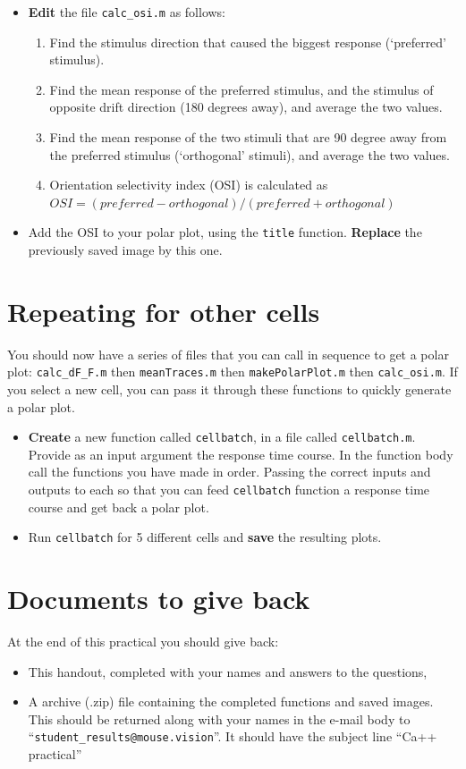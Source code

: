 \documentclass[paper=a4, fontsize=11pt]{article} %
\numberwithin{equation}{section} %
\numberwithin{figure}{section} %
\numberwithin{table}{section} %
\begin{document}
\begin{itemize}
\item \textbf{Edit} the file \texttt{calc\_osi.m} as follows:
  \begin{enumerate}
  \item Find the stimulus direction that caused the biggest response (`preferred' stimulus).
  \item Find the mean response of the preferred stimulus, and the stimulus of opposite drift direction (180 degrees away), and average the two values.
  \item Find the mean response of the two stimuli that are 90 degree away from the preferred stimulus (`orthogonal' stimuli), and average the two values.
  \item Orientation selectivity index (OSI) is calculated as \\ $OSI = {\left(preferred - orthogonal\right)} / {\left(preferred + orthogonal\right)}$
  \end{enumerate}
\item Add the OSI to your polar plot, using the \texttt{title} function.
  \textbf{Replace} the previously saved image by this one.
\end{itemize}


\section{Repeating for other cells}

You should now have a series of files that you can call in sequence to get a polar plot: \texttt{calc\_dF\_F.m} then \texttt{meanTraces.m} then \texttt{makePolarPlot.m} then \texttt{calc\_osi.m}. If you select a new cell, you can pass it through these functions to quickly generate a polar plot.

\begin{itemize}
\item \textbf{Create} a new function called \texttt{cellbatch}, in a file called \texttt{cellbatch.m}. Provide as an input argument the response time course. In the function body call the functions you have made in order. Passing the correct inputs and outputs to each so that you can feed \texttt{cellbatch} function a response time course and get back a polar plot.
\item Run \texttt{cellbatch} for 5 different cells and \textbf{save} the resulting plots.
\end{itemize}


\section*{Documents to give back}
At the end of this practical you should give back:
\begin{itemize}
  \item This handout, completed with your names and answers to the questions,
  \item A archive (.zip) file containing the completed functions and saved images. This should be returned along with your names in the 
  e-mail body to ``\verb|student_results@mouse.vision|''. It should have the subject line ``Ca++ practical''
\end{itemize}
\end{document}
